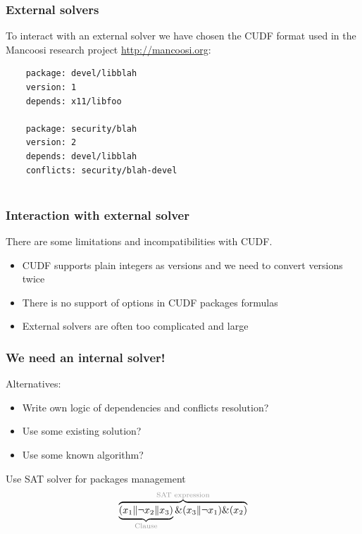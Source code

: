 \documentclass{beamer}
\begin{document}
\begin{frame}[fragile]
\frametitle{External solvers}
To interact with an external solver we have chosen the CUDF format used in the
Mancoosi research project \url{http://mancoosi.org}:
\bigskip
{\small
	\begin{verbatim}
	package: devel/libblah
	version: 1
	depends: x11/libfoo

	package: security/blah
	version: 2
	depends: devel/libblah
	conflicts: security/blah-devel
	
	\end{verbatim}
}
\end{frame}

\begin{frame}
\frametitle{Interaction with external solver}
There are some limitations and incompatibilities with CUDF.
\begin{itemize}
  \item CUDF supports plain integers as versions and we need to convert
  versions twice
  \item<2-> There is no support of options in CUDF packages formulas
  \item<3-> External solvers are often too complicated and large
\end{itemize}
\end{frame}

\begin{frame}
\frametitle{We need an internal solver!}

Alternatives:
\begin{itemize}
  \item Write own logic of dependencies and conflicts resolution?
  \pause
  \item Use some existing solution?
  \pause
  \item Use some known algorithm?
  \pause
\end{itemize}
\bigskip
{\large Use SAT solver for packages management}
\bigskip
\[
\overbrace{\underbrace{(x_1 \| \neg x_2 \|
x_3)}_{\text{\color{light-gray}Clause}} \& (x_3 \| \neg x_1) \&
(x_2)}^{\text{\color{light-gray}SAT expression}}
\]
\end{frame}
\end{document}

